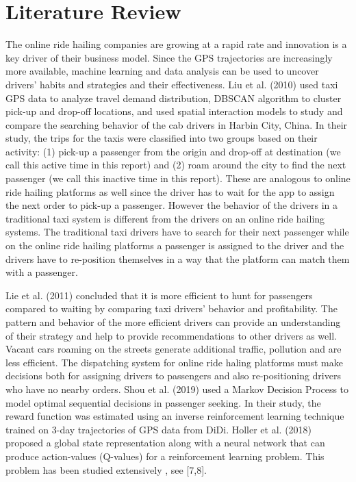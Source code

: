\documentclass[11pt]{article}
\begin{document}
\section{Literature Review}
The online ride hailing companies are growing at a rapid rate and innovation is a key driver of their business model. Since the GPS trajectories are increasingly more available, machine learning and data analysis can be used to uncover drivers' habits and strategies and their effectiveness. Liu et al. (2010) used taxi GPS data to analyze travel demand distribution, DBSCAN algorithm to cluster pick-up and drop-off locations, and used spatial interaction models to study and compare the searching behavior of the cab drivers in Harbin City, China. In their study, the trips for the taxis were classified into two groups based on their activity: (1) pick-up a passenger from the origin and drop-off at destination (we call this active time in this report) and (2) roam around the city to find the next passenger (we call this inactive time in this report). These are analogous to online ride hailing platforms as well since the driver has to wait for the app to assign the next order to pick-up a passenger. However the behavior of the drivers in a traditional taxi system is different from the drivers on an online ride hailing systems. The traditional taxi drivers have to search for their next passenger while on the online ride hailing platforms a passenger is assigned to the driver and the drivers have to re-position themselves in a way that the platform can match them with a passenger. 

Lie et al. (2011) concluded that it is more efficient to hunt for passengers compared to waiting by comparing taxi drivers' behavior and profitability. The pattern and behavior of the more efficient drivers can provide an understanding of their strategy and help to provide recommendations to other drivers as well. Vacant cars roaming on the streets generate additional traffic, pollution and are less efficient. The dispatching system for online ride haling platforms must make decisions both for assigning drivers to passengers and also re-positioning drivers who have no nearby orders.   Shou et al. (2019) used a Markov Decision Process to model optimal sequential decisions in passenger seeking. In their study, the reward function was estimated using an inverse reinforcement learning technique trained on 3-day trajectories of GPS data from DiDi. Holler et al. (2018) proposed a global state representation along with a neural network that can produce action-values (Q-values) for a reinforcement learning problem. This problem has been studied extensively , see [7,8].
\end{document}
